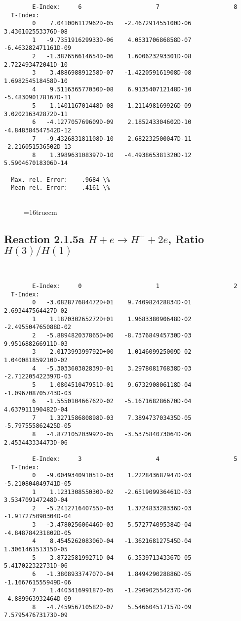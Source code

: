 \documentclass[12pt,dvipdfmx]{article}
\begin{document}
{\begin{small}
\begin{verbatim}
        E-Index:     6                     7                     8
  T-Index:
        0    7.041006112962D-05   -2.467291455100D-06    3.436102553376D-08
        1   -9.735191629933D-06    4.053170686858D-07   -6.463282471161D-09
        2   -1.387656614654D-06    1.600623293301D-08    2.722493472041D-10
        3    3.488698891258D-07   -1.422059161908D-08    1.698254518458D-10
        4    9.511636577030D-08    6.913540712148D-10   -5.483090178167D-11
        5    1.140116701448D-08   -1.211498169926D-09    3.020216342872D-11
        6   -4.127705769609D-09    2.185243304602D-10   -4.848384547542D-12
        7   -9.432683181108D-10    2.682232500047D-11   -2.216051536502D-13
        8    1.398963108397D-10   -4.493865381320D-12    5.590467018306D-14

  Max. rel. Error:    .9684 \%
  Mean rel. Error:    .4161 \%


\end{verbatim}\end{small}
\begin{figure} \label{2.1.5_equil}
\epsfxsize=16truecm
\end{figure}
\newpage

\subsection{
Reaction 2.1.5a  $H + e \rightarrow H^+ + 2e $, Ratio $H(3)/H(1)$
}

\begin{small}\begin{verbatim}


        E-Index:     0                     1                     2
  T-Index:
        0   -3.082877684472D+01    9.740982428834D-01    2.693447564427D-02
        1    1.187030265272D+01    1.968338090648D-02   -2.495504765088D-02
        2   -5.889482037865D+00   -8.737684945730D-03    9.951688266911D-03
        3    2.017399399792D+00   -1.014609925009D-02    1.040081859210D-02
        4   -5.303360302839D-01    3.297808176838D-03   -2.712205422397D-03
        5    1.080451047951D-01    9.673290806118D-04   -1.096708705743D-03
        6   -1.555010466762D-02   -5.167168286670D-04    4.637911190482D-04
        7    1.327158680898D-03    7.389473703435D-05   -5.797555862425D-05
        8   -4.872105203992D-05   -3.537584073064D-06    2.453443334473D-06

        E-Index:     3                     4                     5
  T-Index:
        0   -9.004934091051D-03    1.222843687947D-03   -5.210804049741D-05
        1    1.123130855030D-02   -2.651909936461D-03    3.534709147248D-04
        2   -5.241271640755D-03    1.372483328336D-03   -1.917275090304D-04
        3   -3.478025606446D-03    5.572774095384D-04   -4.848784231802D-05
        4    8.454526208306D-04   -1.362168127545D-04    1.306146151315D-05
        5    3.872258199271D-04   -6.353971343367D-05    5.417022322731D-06
        6   -1.380893374707D-04    1.849429028886D-05   -1.166761555949D-06
        7    1.440341699187D-05   -1.290902554237D-06   -4.889963932464D-09
        8   -4.745956710582D-07    5.546604517157D-09    7.579547673173D-09


\end{verbatim}
\end{small}}
\end{document}
